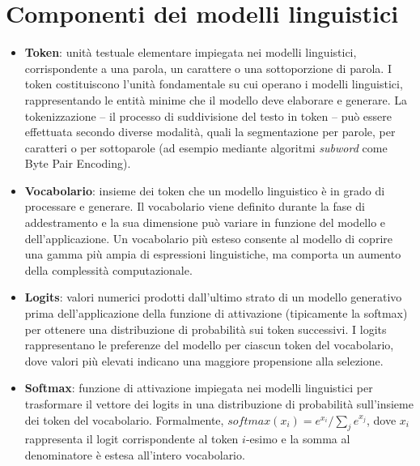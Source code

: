 \section{Componenti dei modelli linguistici}
\begin{itemize}
	\item \textbf{Token}: unità testuale elementare impiegata nei modelli linguistici, corrispondente a una parola, un carattere o una sottoporzione di parola. I token costituiscono l'unità fondamentale su cui operano i modelli linguistici, rappresentando le entità minime che il modello deve elaborare e generare. La tokenizzazione -- il processo di suddivisione del testo in token -- può essere effettuata secondo diverse modalità, quali la segmentazione per parole, per caratteri o per sottoparole (ad esempio mediante algoritmi \emph{subword} come Byte Pair Encoding).
	\item \textbf{Vocabolario}: insieme dei token che un modello linguistico è in grado di processare e generare. Il vocabolario viene definito durante la fase di addestramento e la sua dimensione può variare in funzione del modello e dell'applicazione. Un vocabolario più esteso consente al modello di coprire una gamma più ampia di espressioni linguistiche, ma comporta un aumento della complessità computazionale.
	\item \textbf{Logits}: valori numerici prodotti dall'ultimo strato di un modello generativo prima dell'applicazione della funzione di attivazione (tipicamente la softmax) per ottenere una distribuzione di probabilità sui token successivi. I logits rappresentano le preferenze del modello per ciascun token del vocabolario, dove valori più elevati indicano una maggiore propensione alla selezione.
	\item \textbf{Softmax}: funzione di attivazione impiegata nei modelli linguistici per trasformare il vettore dei logits in una distribuzione di probabilità sull'insieme dei token del vocabolario. Formalmente, $\mathit{softmax}(x_i) = e^{x_i} / \sum_{j} e^{x_j}$, dove $x_i$ rappresenta il logit corrispondente al token $i$-esimo e la somma al denominatore è estesa all'intero vocabolario.
\end{itemize}

